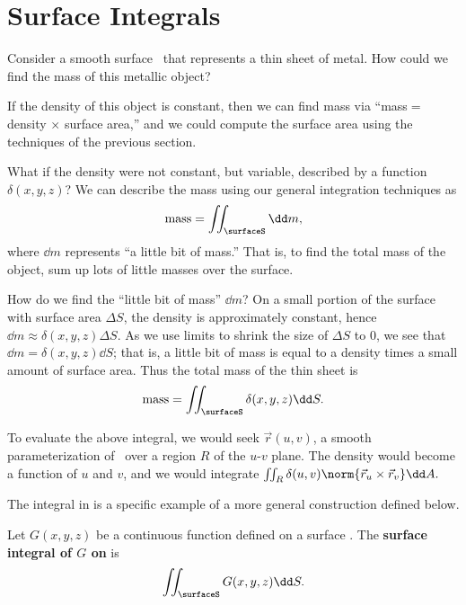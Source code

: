 \section{Surface Integrals}\label{sec:surface_integral}

Consider a smooth surface \surfaceS\ that represents a thin sheet of metal. How could we find the mass of this metallic object?

If the density of this object is constant, then we can find mass via ``mass$=$ density $\times$ surface area,'' and we could compute the surface area using the techniques of the previous section. 

What if the density were not constant, but variable, described by a function $\delta(x,y,z)$? We can describe the mass using our general integration techniques as
\[\text{mass} = \iint_\surfaceS \dd m,\]
where $\dd m$ represents ``a little bit of mass.'' That is, to find the total mass of the object, sum up lots of little masses over the surface.

How do we find the ``little bit of mass'' $\dd m$? On a small portion of the surface with surface area $\Delta S$, the density is approximately constant, hence $\dd m \approx \delta(x,y,z)\Delta S$. As we use limits to shrink the size of $\Delta S$ to 0, we see that $\dd m = \delta(x,y,z)\dd S$; that is, a little bit of mass is equal to a density times a small amount of surface area. Thus the total mass of the thin sheet is
\begin{equation}
\text{mass} =\iint_\surfaceS \delta(x,y,z)\dd S.\label{eq:surface_int}
\end{equation}

To evaluate the above integral, we would seek $\vec r(u,v)$, a smooth parameterization of \surfaceS\ over a region $R$ of the $u$-$v$ plane. The density would become a function of $u$ and $v$, and we would integrate $\iint_R \delta(u,v)\norm{\vec r_u\times \vec r_v}\dd A.$

The integral in  is a specific example of a more general construction defined below.

\begin{definition}\label{def:surface_integral}
Let $G(x,y,z)$ be a continuous function defined on a surface \surfaceS. The \textbf{surface integral of $G$ on \surfaceS} is
\[\iint_\surfaceS G(x,y,z)\dd S.\]
\end{definition}

